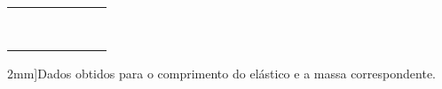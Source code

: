 \begin{table*}
\begin{center}
\begin{tabular}{lp{25mm}p{25mm}lp{25mm}p{25mm}l}
		& \cellcolor[gray]{0.89} & \cellcolor[gray]{0.92} & & \cellcolor[gray]{0.89} & \cellcolor[gray]{0.92} & \\
		& \cellcolor[gray]{0.95} & \cellcolor[gray]{0.97} & & \cellcolor[gray]{0.95} & \cellcolor[gray]{0.97} & \\
		& \cellcolor[gray]{0.89} & \cellcolor[gray]{0.92} & & \cellcolor[gray]{0.89} & \cellcolor[gray]{0.92} & \\
		& \cellcolor[gray]{0.95} & \cellcolor[gray]{0.97} & & \cellcolor[gray]{0.95} & \cellcolor[gray]{0.97} & \\
		& \cellcolor[gray]{0.89} & \cellcolor[gray]{0.92} & & \cellcolor[gray]{0.89} & \cellcolor[gray]{0.92} & \\
		& \cellcolor[gray]{0.95} & \cellcolor[gray]{0.97} & & \cellcolor[gray]{0.95} & \cellcolor[gray]{0.97} & \\
		& \cellcolor[gray]{0.89} & \cellcolor[gray]{0.92} & & \cellcolor[gray]{0.89} & \cellcolor[gray]{0.92} & \\
		& \cellcolor[gray]{0.95} & \cellcolor[gray]{0.97} & & \cellcolor[gray]{0.95} & \cellcolor[gray]{0.97} & \\
\bottomrule
		\end{tabular}
	\caption[][2mm]{Dados obtidos para o comprimento do elástico e a massa correspondente.}\label{Tab:CargaEDescargaCapacitor}
	\end{center}
\end{table*}

